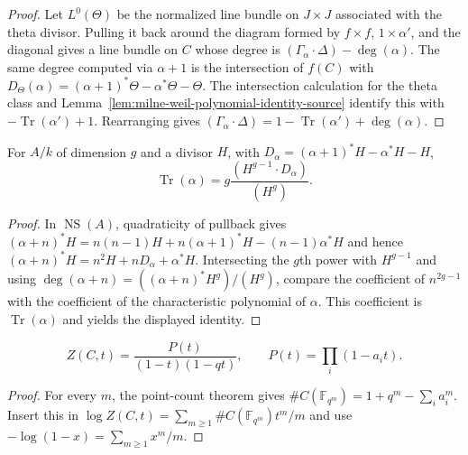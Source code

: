 \begin{proof}

Let $L^0(\Theta)$ be the normalized line bundle on $J\times J$ associated
with the theta divisor.  Pulling it back around the diagram formed by
$f\times f$, $1\times\alpha'$, and the diagonal gives a line bundle on $C$
whose degree is
$(\Gamma_\alpha\cdot\Delta)-\deg(\alpha)$.  The same degree computed via
$\alpha+1$ is the intersection of $f(C)$ with
$D_\Theta(\alpha)=(\alpha+1)^*\Theta-\alpha^*\Theta-\Theta$.
The intersection calculation for the theta class and
Lemma~\ref{lem:milne-weil-polynomial-identity-source} identify this with
$-\operatorname{Tr}(\alpha')+1$.  Rearranging gives
$(\Gamma_\alpha\cdot\Delta)=1-\operatorname{Tr}(\alpha')+\deg(\alpha)$.

\end{proof}


\begin{lemma}
\label{lem:milne-weil-polynomial-identity-source}

For $A/k$ of dimension $g$ and a divisor $H$, with $D_\alpha=(\alpha+1)^*H-\alpha^*H-H$,
\[
\operatorname{Tr}(\alpha)=g\frac{(H^{g-1}\cdot D_\alpha)}{(H^g)}.
\]
\end{lemma}

\begin{proof}

In $\operatorname{NS}(A)$, quadraticity of pullback gives
$(\alpha+n)^*H=n(n-1)H+n(\alpha+1)^*H-(n-1)\alpha^*H$
and hence
$(\alpha+n)^*H=n^2H+nD_\alpha+\alpha^*H$.  Intersecting the $g$th power
with $H^{g-1}$ and using
$\deg(\alpha+n)=((\alpha+n)^*H^g)/(H^g)$, compare the coefficient of
$n^{2g-1}$ with the coefficient of the characteristic polynomial of $\alpha$.
This coefficient is $\operatorname{Tr}(\alpha)$ and yields the displayed
identity.

\end{proof}


\begin{corollary}
\label{cor:milne-curve-zeta-source}

\[
Z(C,t)=\frac{P(t)}{(1-t)(1-qt)},\qquad
P(t)=\prod_i(1-a_i t).
\]
\end{corollary}
\begin{proof}
For every $m$, the point-count theorem gives
$\#C(\mathbb F_{q^m})=1+q^m-\sum_i a_i^m$.  Insert this in
$\log Z(C,t)=\sum_{m\ge1}\#C(\mathbb F_{q^m})t^m/m$ and use
$-\log(1-x)=\sum_{m\ge1}x^m/m$.
\end{proof}


